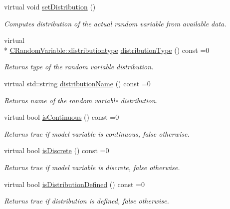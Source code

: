 \begin{DoxyCompactItemize}
virtual void \hyperlink{class_go_s_u_m_1_1_c_model_variable_a7d4e06b18bd92b412112cbd8f3374d5b}{set\-Distribution} ()
\begin{DoxyCompactList}\small\item\em Computes distribution of the actual random variable from available data. \end{DoxyCompactList}\item 
virtual \\*
\hyperlink{class_c_random_variable_a80d2a87c43847274138b51f7d713d7f1}{C\-Random\-Variable\-::distributiontype} \hyperlink{class_go_s_u_m_1_1_c_model_variable_a7d8d75d0c4657a6b19ded363571bdec4}{distribution\-Type} () const =0
\begin{DoxyCompactList}\small\item\em Returns type of the random variable distribution. \end{DoxyCompactList}\item 
virtual std\-::string \hyperlink{class_go_s_u_m_1_1_c_model_variable_ab363a847d6c2c562e8f7ee22f0cf6f02}{distribution\-Name} () const =0
\begin{DoxyCompactList}\small\item\em Returns name of the random variable distribution. \end{DoxyCompactList}\item 
virtual bool \hyperlink{class_go_s_u_m_1_1_c_model_variable_a2ec4aee717249dcbad98fd6e6320a6b7}{is\-Continuous} () const =0
\begin{DoxyCompactList}\small\item\em Returns true if model variable is continuous, false otherwise. \end{DoxyCompactList}\item 
virtual bool \hyperlink{class_go_s_u_m_1_1_c_model_variable_a9d0140b610b7a1c04a3b31e2d84f86da}{is\-Discrete} () const =0
\begin{DoxyCompactList}\small\item\em Returns true if model variable is discrete, false otherwise. \end{DoxyCompactList}\item 
virtual bool \hyperlink{class_go_s_u_m_1_1_c_model_variable_a0ab50d62f624918807daef90d881c3da}{is\-Distribution\-Defined} () const =0
\begin{DoxyCompactList}\small\item\em Returns true if distribution is defined, false otherwise. \end{DoxyCompactList}\item 

\end{DoxyCompactItemize}
